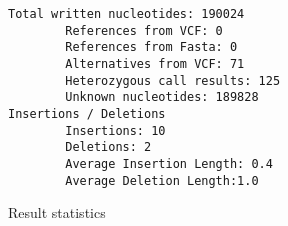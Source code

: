 \begin{figure}[h]
\caption{Result statistics}
\label{fig:statistics}
\begin{verbatim}
Total written nucleotides: 190024
        References from VCF: 0
        References from Fasta: 0
        Alternatives from VCF: 71
        Heterozygous call results: 125
        Unknown nucleotides: 189828
Insertions / Deletions
        Insertions: 10
        Deletions: 2
        Average Insertion Length: 0.4
        Average Deletion Length:1.0
\end{verbatim}
\end{figure}